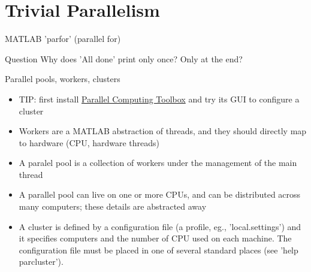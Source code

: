 \documentclass[pdflatex,colorlinks,landscape]{beamer}
\renewcommand\emph[1]{{\color{magenta}#1}}
\begin{document}
\section{Trivial Parallelism}

\begin{frame}[allowframebreaks]{MATLAB 'parfor' (parallel for)}
  \begin{small}
    
  \end{small}
  \begin{tiny}
  \end{tiny}
  \begin{block}{Question}
    Why does 'All done' print only once? Only at the end?
  \end{block}
\end{frame}

\begin{frame}{Parallel pools, workers, clusters}
  \begin{itemize}
  \item TIP: first  install \href{https://www.mathworks.com/products/parallel-computing.html}{Parallel
      Computing Toolbox} and try its GUI to configure a cluster
  \item \emph{Workers} are a MATLAB abstraction of threads, and
    they should directly map to hardware (CPU, hardware threads)
  \item A \emph{paralel pool} is a collection of workers under the
    management of the \emph{main thread}
  \item A parallel pool can live on one or more CPUs, and can be distributed
    across many computers; these details are abstracted away
  \item A \emph{cluster} is defined by a configuration file (a
    \emph{profile}, eg., 'local.settings') and it specifies computers
    and the number of CPU used on each machine. The configuration file
    must be placed in one of several standard places (see 'help
    parcluster').
  \end{itemize}
\end{frame}
\end{document}
